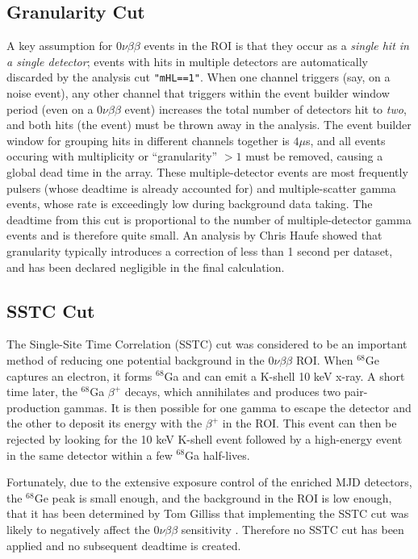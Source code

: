 \documentclass[notitlepage,rmp,aps,10pt]{revtex4-1}
\def\nuc#1#2{${}^{#1}$#2}
\newcommand{\tty}{\texttt}
\begin{document}
\subsection{Granularity Cut}

A key assumption for $0\nu\beta\beta$ events in the ROI is that they occur as a \textit{single hit in a single detector}; events with hits in multiple detectors are automatically discarded by the analysis cut \tty{"mHL==1"}.
When one channel triggers (say, on a noise event), any other channel that triggers within the event builder window period (even on a $0\nu\beta\beta$ event) increases the total number of detectors hit to \textit{two}, and both hits (the event) must be thrown away in the analysis.
The event builder window for grouping hits in different channels together is $4\mu$s, and all events occuring with multiplicity or ``granularity'' $>1$ must be removed, causing a global dead time in the array.
These multiple-detector events are most frequently pulsers (whose deadtime is already accounted for) and multiple-scatter gamma events, whose rate is exceedingly low during background data taking.
The deadtime from this cut is proportional to the number of multiple-detector gamma events and is therefore quite small.  An analysis by Chris Haufe showed that granularity typically introduces a correction of less than 1 second per dataset, and has been declared negligible in the final calculation.


\subsection{SSTC Cut}

The Single-Site Time Correlation (SSTC) cut was considered to be an important method of reducing one potential background in the $0\nu\beta\beta$ ROI.
When \nuc{68}{Ge} captures an electron, it forms \nuc{68}{Ga} and can emit a K-shell 10 keV x-ray.
A short time later, the \nuc{68}{Ga} $\beta^+$ decays, which annihilates and produces two pair-production gammas.
It is then possible for one gamma to escape the detector and the other to deposit its energy with the $\beta^+$ in the ROI.
This event can then be rejected by looking for the 10 keV K-shell event followed by a high-energy event in the same detector within a few  \nuc{68}{Ga} half-lives.

Fortunately, due to the extensive exposure control of the enriched MJD detectors, the \nuc{68}{Ge} peak is small enough, and the background in the ROI is low enough, that it has been determined by Tom Gilliss that implementing the SSTC cut was likely to negatively affect the $0\nu\beta\beta$ sensitivity \cite{Gilliss2016}.
Therefore no SSTC cut has been applied and no subsequent deadtime is created.
\end{document}
